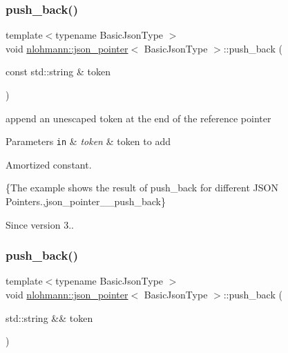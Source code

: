 \subsubsection{\texorpdfstring{push\+\_\+back()}{push\_back()}\hspace{0.1cm}{\footnotesize\ttfamily [1/2]}}
{\footnotesize\ttfamily template$<$typename Basic\+Json\+Type $>$ \\
void \mbox{\hyperlink{classnlohmann_1_1json__pointer}{nlohmann\+::json\+\_\+pointer}}$<$ Basic\+Json\+Type $>$\+::push\+\_\+back (\begin{DoxyParamCaption}\item[{const std\+::string \&}]{token }\end{DoxyParamCaption})\hspace{0.3cm}{\ttfamily [inline]}}



append an unescaped token at the end of the reference pointer 


\begin{DoxyParams}[1]{Parameters}
\mbox{\tt in}  & {\em token} & token to add\\
\hline
\end{DoxyParams}
Amortized constant.

\{The example shows the result of {\ttfamily push\+\_\+back} for different J\+S\+ON Pointers.,json\+\_\+pointer\+\_\+\+\_\+push\+\_\+back\}

\begin{DoxySince}{Since}
version 3.. 
\end{DoxySince}
\mbox{\label{classnlohmann_1_1json__pointer_ac228b13596d3c34185da9fe61b570194}} 
\subsubsection{\texorpdfstring{push\+\_\+back()}{push\_back()}\hspace{0.1cm}{\footnotesize\ttfamily [2/2]}}
{\footnotesize\ttfamily template$<$typename Basic\+Json\+Type $>$ \\
void \mbox{\hyperlink{classnlohmann_1_1json__pointer}{nlohmann\+::json\+\_\+pointer}}$<$ Basic\+Json\+Type $>$\+::push\+\_\+back (\begin{DoxyParamCaption}\item[{std\+::string \&\&}]{token }\end{DoxyParamCaption})\hspace{0.3cm}{\ttfamily [inline]}}



